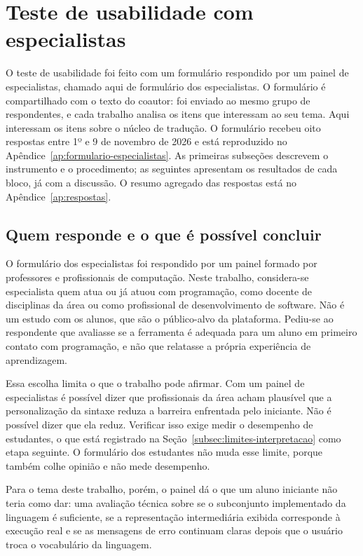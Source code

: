 \section{Teste de usabilidade com especialistas}
\label{sec:protocolo-avaliacao}\label{sec:avaliacao-especialistas}

O teste de usabilidade foi feito com um formulário respondido por um painel de especialistas, chamado aqui de formulário dos especialistas. O formulário é compartilhado com o texto do coautor: foi enviado ao mesmo grupo de respondentes, e cada trabalho analisa os itens que interessam ao seu tema. Aqui interessam os itens sobre o núcleo de tradução. O formulário recebeu oito respostas entre 1º e 9 de novembro de 2026 e está reproduzido no Apêndice~\ref{ap:formulario-especialistas}. As primeiras subseções descrevem o instrumento e o procedimento; as seguintes apresentam os resultados de cada bloco, já com a discussão. O resumo agregado das respostas está no Apêndice~\ref{ap:respostas}.

\subsection{Quem responde e o que é possível concluir}

O formulário dos especialistas foi respondido por um painel formado por professores e profissionais de computação. Neste trabalho, considera-se especialista quem atua ou já atuou com programação, como docente de disciplinas da área ou como profissional de desenvolvimento de software. Não é um estudo com os alunos, que são o público-alvo da plataforma. Pediu-se ao respondente que avaliasse se a ferramenta é adequada para um aluno em primeiro contato com programação, e não que relatasse a própria experiência de aprendizagem.

Essa escolha limita o que o trabalho pode afirmar. Com um painel de especialistas é possível dizer que profissionais da área acham plausível que a personalização da sintaxe reduza a barreira enfrentada pelo iniciante. Não é possível dizer que ela reduz. Verificar isso exige medir o desempenho de estudantes, o que está registrado na Seção~\ref{subsec:limites-interpretacao} como etapa seguinte. O formulário dos estudantes não muda esse limite, porque também colhe opinião e não mede desempenho.

Para o tema deste trabalho, porém, o painel dá o que um aluno iniciante não teria como dar: uma avaliação técnica sobre se o subconjunto implementado da linguagem é suficiente, se a representação intermediária exibida corresponde à execução real e se as mensagens de erro continuam claras depois que o usuário troca o vocabulário da linguagem.

